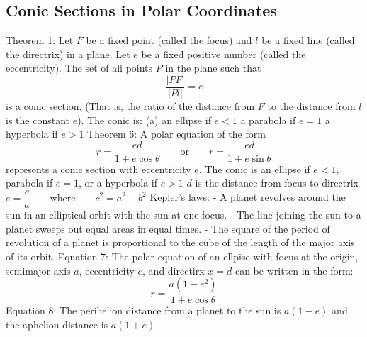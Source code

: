\documentclass{article}
\begin{document}
    \subsection{Conic Sections in Polar Coordinates}
    \begin{outline}
        \1 Theorem 1: Let $F$ be a fixed point (called the focus) and $l$ be a fixed line (called the directrix) in a plane. Let $e$ be a fixed positive number (called the eccentricity). The set of all points $P$ in the plane such that \[\dfrac{|PF|}{|Pl|}=e\] is a conic section. (That is, the ratio of the distance from $F$ to the distance from $l$ is the constant $e$). The conic is: 
            \2 (a) an ellipse if \(e<1\)
            \2 a parabola if \(e=1\)
            \2 a hyperbola if \(e>1\)
        \1 Theorem 6: A polar equation of the form \[r=\dfrac{ed}{1\pm e\cos\theta}\qquad\text{or}\qquad r=\dfrac{ed}{1\pm e\sin\theta}\] represents a conic section with eccentricity $e$. The conic is an ellipse if \(e<1\), parabola if \(e=1\), or a hyperbola if \(e>1\)
            \2 $d$ is the distance from focus to directrix
        \1 \(e=\dfrac{c}{a}\qquad\text{where}\qquad c^2=a^2+b^2\)
        \1 Kepler's laws: 
             - A planet revolves around the sun in an elliptical orbit with the sun at one focus. 
             - The line joining the sun to a planet sweeps out equal areas in equal times. 
             - The square of the period of revolution of a planet is proportional to the cube of the length of the major axis of its orbit. 
        \1 Equation 7: The polar equation of an ellpise with focus at the origin, semimajor axis $a$, eccentricity $e$, and directirx \(x=d\) can be written in the form: \[r=\dfrac{a(1-e^2)}{1+e\cos\theta}\]
        \1 Equation 8: The perihelion distance from a planet to the sun is \(a(1-e)\) and the aphelion distance is \(a(1+e)\)
    \end{outline}
\end{document}
